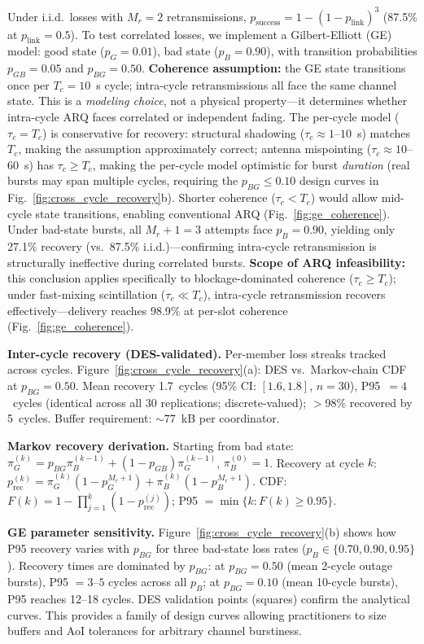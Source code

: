 \documentclass[journal]{IEEEtran}
\begin{document}
Under i.i.d.\ losses with $M_r = 2$ retransmissions, $p_{\text{success}} = 1 - (1 - p_{\text{link}})^{3}$ (87.5\% at $p_{\text{link}} = 0.5$). To test correlated losses, we implement a Gilbert-Elliott (GE) model: good state ($p_G = 0.01$), bad state ($p_B = 0.90$), with transition probabilities $p_{GB} = 0.05$ and $p_{BG} = 0.50$. \textbf{Coherence assumption:} the GE state transitions once per $T_c = 10$~s cycle; intra-cycle retransmissions all face the same channel state. This is a \emph{modeling choice}, not a physical property---it determines whether intra-cycle ARQ faces correlated or independent fading. The per-cycle model ($\tau_c = T_c$) is conservative for recovery: structural shadowing ($\tau_c \approx 1$--$10$~s) matches $T_c$, making the assumption approximately correct; antenna mispointing ($\tau_c \approx 10$--$60$~s) has $\tau_c \geq T_c$, making the per-cycle model optimistic for burst \emph{duration} (real bursts may span multiple cycles, requiring the $p_{BG} \leq 0.10$ design curves in Fig.~\ref{fig:cross_cycle_recovery}b). Shorter coherence ($\tau_c < T_c$) would allow mid-cycle state transitions, enabling conventional ARQ (Fig.~\ref{fig:ge_coherence}). Under bad-state bursts, all $M_r + 1 = 3$ attempts face $p_B = 0.90$, yielding only 27.1\% recovery (vs.\ 87.5\% i.i.d.)---confirming intra-cycle retransmission is structurally ineffective during correlated bursts. \textbf{Scope of ARQ infeasibility:} this conclusion applies specifically to blockage-dominated coherence ($\tau_c \geq T_c$); under fast-mixing scintillation ($\tau_c \ll T_c$), intra-cycle retransmission recovers effectively---delivery reaches 98.9\% at per-slot coherence (Fig.~\ref{fig:ge_coherence}).

\textbf{Inter-cycle recovery (DES-validated).} Per-member loss streaks tracked across cycles. Figure~\ref{fig:cross_cycle_recovery}(a): DES vs.\ Markov-chain CDF at $p_{BG} = 0.50$. Mean recovery 1.7~cycles (95\% CI: $[1.6, 1.8]$, $n = 30$), P95~$= 4$~cycles (identical across all 30 replications; discrete-valued); $>$98\% recovered by 5~cycles. Buffer requirement: ${\sim}77$~kB per coordinator.

\textbf{Markov recovery derivation.} Starting from bad state: $\pi_G^{(k)} = p_{BG} \pi_B^{(k-1)} + (1 - p_{GB}) \pi_G^{(k-1)}$, $\pi_B^{(0)} = 1$. Recovery at cycle $k$: $p_{\text{rec}}^{(k)} = \pi_G^{(k)}(1 - p_G^{M_r+1}) + \pi_B^{(k)}(1 - p_B^{M_r+1})$. CDF: $F(k) = 1 - \prod_{j=1}^{k}(1 - p_{\text{rec}}^{(j)})$; P95 $= \min\{k : F(k) \geq 0.95\}$.

\textbf{GE parameter sensitivity.} Figure~\ref{fig:cross_cycle_recovery}(b) shows how P95 recovery varies with $p_{BG}$ for three bad-state loss rates ($p_B \in \{0.70, 0.90, 0.95\}$). Recovery times are dominated by $p_{BG}$: at $p_{BG} = 0.50$ (mean 2-cycle outage bursts), P95 $= 3$--$5$ cycles across all $p_B$; at $p_{BG} = 0.10$ (mean 10-cycle bursts), P95 reaches 12--18 cycles. DES validation points (squares) confirm the analytical curves. This provides a family of design curves allowing practitioners to size buffers and AoI tolerances for arbitrary channel burstiness.
\end{document}

